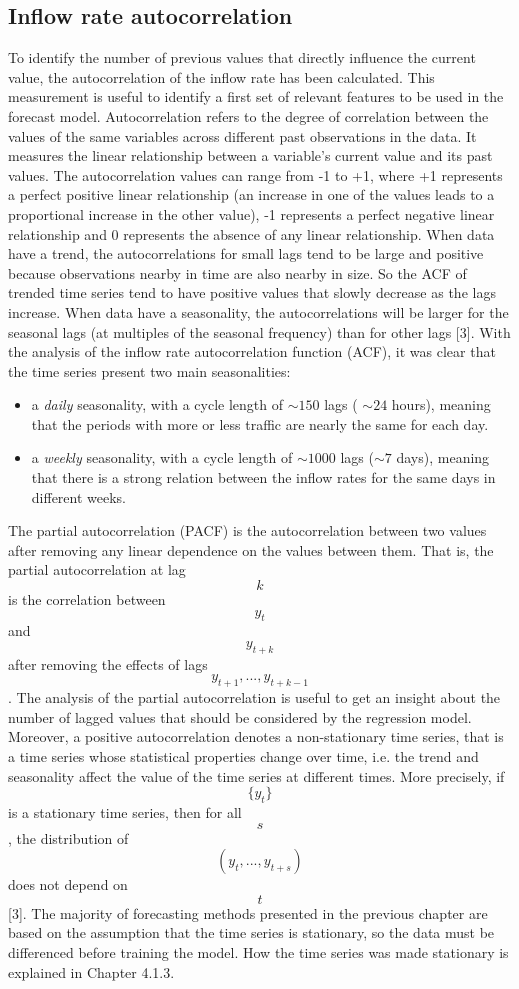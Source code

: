 \subsection{Inflow rate autocorrelation}
\label{subsec:autocorrelation}
To identify the number of previous values that directly influence the current value, the autocorrelation of the inflow rate has been calculated. This measurement is useful to identify a first set of relevant features to be used in the forecast model.
Autocorrelation refers to the degree of correlation between the values of the same variables across different past observations in the data. It measures the linear relationship between a variable's current value and its past values. The autocorrelation values can range from -1 to +1, where +1 represents a perfect positive linear relationship (an increase in one of the values leads to a proportional increase in the other value), -1 represents a perfect negative linear relationship and 0 represents the absence of any linear relationship. When data have a trend, the autocorrelations for small lags tend to be large and positive because observations nearby in time are also nearby in size. So the ACF of trended time series tend to have positive values that slowly decrease as the lags increase. When data have a seasonality, the autocorrelations will be larger for the seasonal lags (at multiples of the seasonal frequency) than for other lags [3]. With the analysis of the inflow rate autocorrelation function (ACF), it was clear that the time series present two main seasonalities:
\begin{itemize}
  \item a \emph{daily} seasonality, with a cycle length of \( \sim150 \) lags ( \( \sim24 \) hours), meaning that the periods with more or less traffic are nearly the same for each day.
  \item a \emph{weekly} seasonality, with a cycle length of \( \sim1000 \) lags (\( \sim7 \) days), meaning that there is a strong relation between the inflow rates for the same days in different weeks.
\end{itemize}

The partial autocorrelation (PACF) is the autocorrelation between two values after removing any linear dependence on the values between them. That is, the partial autocorrelation at lag $$ k $$ is the correlation between $$ y_t $$ and $$ y_{t+k} $$ after removing the effects of lags $$ y_{t+1}, ..., y_{t+k-1} $$. The analysis of the partial autocorrelation is useful to get an insight about the number of lagged values that should be considered by the regression model. Moreover, a positive autocorrelation denotes a non-stationary time series, that is a time series whose statistical properties change over time, i.e. the trend and seasonality affect the value of the time series at different times. More precisely, if $$ \{ y_t \} $$ is a stationary time series, then for all $$ s $$, the distribution of $$ ( y_t, ..., y_{t+s}) $$ does not depend on $$ t $$ [3]. The majority of forecasting methods presented in the previous chapter are based on the assumption that the time series is stationary, so the data must be differenced before training the model. How the time series was made stationary is explained in Chapter 4.1.3.

